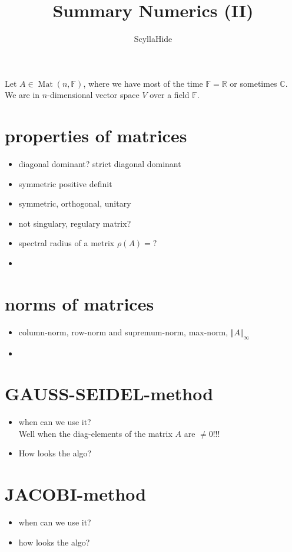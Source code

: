 \documentclass[]{scrartcl}
\title{Summary Numerics (II)}
\author{ScyllaHide}
\newcommand{\C}{\mathbb{C}}
\newcommand{\R}{\mathbb{R}}
\newcommand{\F}{\mathbb{F}}
\newcommand{\<}{\trianglelefteq}
\newcommand{\norm}[2]{\Vert #1 \Vert_{#2}}
\DeclareMathOperator{\Mat}{Mat}
\begin{document}
\maketitle

Let $A \in \Mat(n,\F)$, where we have most of the time $\F = \R$ or sometimes $\C$. We are in $n$-dimensional vector space $V$ over a field $\F$.

\section*{properties of matrices}
\begin{itemize}
	\item diagonal dominant? strict diagonal dominant
	\item symmetric positive definit
	\item symmetric, orthogonal, unitary
	\item not singulary, regulary matrix?
	\item spectral radius of a metrix $\rho(A) = ?$
	\item 
\end{itemize}

\section*{norms of matrices}
\begin{itemize}
	\item column-norm, row-norm and supremum-norm, max-norm, $\norm{A}{\infty}$
	\item 
\end{itemize}

\section*{GAUSS-SEIDEL-method}
\begin{itemize}
	\item when can we use it?\\ Well when the diag-elements of the matrix $A$ are $\neq 0$!!!
	\item How looks the algo?\\
\end{itemize}

\section*{JACOBI-method}
\begin{itemize}
	\item when can we use it?\\
	\item how looks the algo?\\
\end{itemize}
\end{document}
